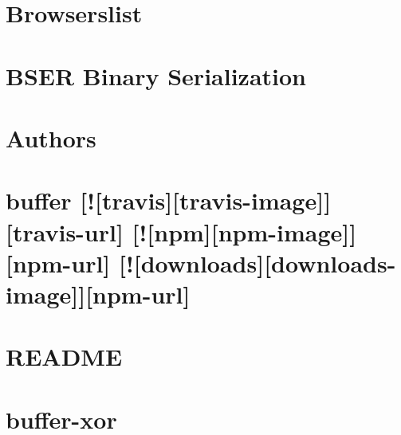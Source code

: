 \documentclass[twoside]{book}
\newcommand{\+}{\discretionary{\mbox{\scriptsize$\hookleftarrow$}}{}{}}
\begin{document}
\chapter{Browserslist}
\label{md__c_1_workspace_demo_src_main_script_node_modules_browserslist__r_e_a_d_m_e}

\chapter{B\+S\+ER Binary Serialization}
\label{md__c_1_workspace_demo_src_main_script_node_modules_bser__r_e_a_d_m_e}

\chapter{Authors}
\label{md__c_1_workspace_demo_src_main_script_node_modules_buffer__a_u_t_h_o_r_s}

\chapter{buffer \mbox{[}!\mbox{[}travis\mbox{]}\mbox{[}travis-\/image\mbox{]}\mbox{]}\mbox{[}travis-\/url\mbox{]} \mbox{[}!\mbox{[}npm\mbox{]}\mbox{[}npm-\/image\mbox{]}\mbox{]}\mbox{[}npm-\/url\mbox{]} \mbox{[}!\mbox{[}downloads\mbox{]}\mbox{[}downloads-\/image\mbox{]}\mbox{]}\mbox{[}npm-\/url\mbox{]}}
\label{md__c_1_workspace_demo_src_main_script_node_modules_buffer__r_e_a_d_m_e}

\chapter{R\+E\+A\+D\+ME}
\label{md__c_1_workspace_demo_src_main_script_node_modules_buffer-indexof__r_e_a_d_m_e}

\chapter{buffer-\/xor}
\label{md__c_1_workspace_demo_src_main_script_node_modules_buffer-xor__r_e_a_d_m_e}

\end{document}
